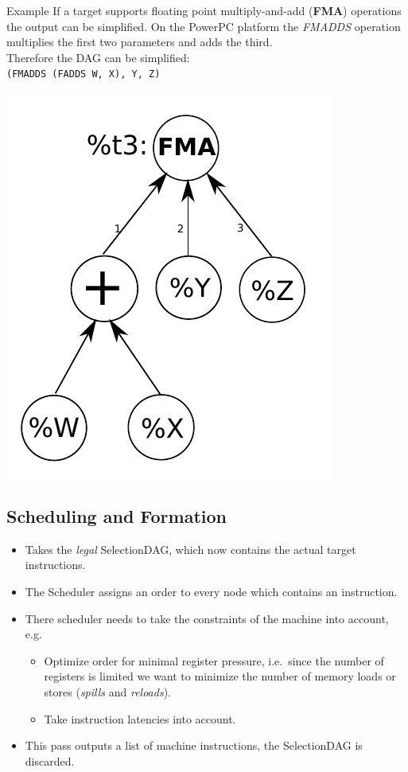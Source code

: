 \documentclass[]{beamer}
\begin{document}
\begin{frame}[fragile]{Example}
If a target supports floating point multiply-and-add (\textbf{FMA}) operations the output can be simplified.
On the PowerPC platform the \textit{FMADDS} operation multiplies the first two parameters and adds the third.\\
Therefore the DAG can be simplified:\\
\lstinline{(FMADDS (FADDS W, X), Y, Z)}
\begin{center}
      \includegraphics[width=.4\textwidth]{pictures/dag_fma}
\end{center}
\end{frame}


\subsection{Scheduling and Formation}
\begin{frame}{}
\begin{itemize}
  \item Takes the \textit{legal} SelectionDAG, which now contains the actual target instructions.
  \item The Scheduler assigns an order to every node which contains an instruction.
  \item There scheduler needs to take the constraints of the machine into account, e.g.\
  \begin{itemize}
    \item Optimize order for minimal register pressure, i.e.\ since the number of registers is limited we want 
          to minimize the number of memory loads or stores (\textit{spills} and \textit{reloads}).
    \item Take instruction latencies into account.
  \end{itemize}
  \item This pass outputs a list of machine instructions, the SelectionDAG is discarded.
\end{itemize}
\end{frame}
\end{document}
